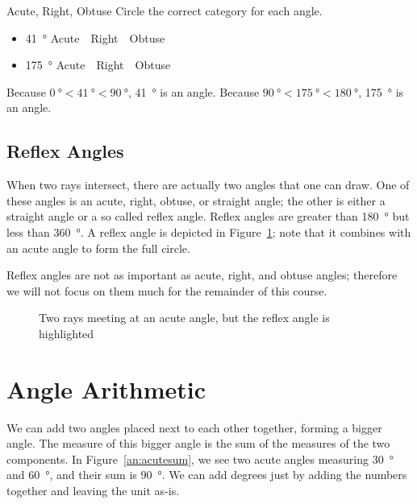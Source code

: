 \documentclass[a4paper,10pt]{report}
\begin{document}
\begin{problem}{Acute, Right, Obtuse}
 Circle the correct category for each angle.

 \begin{itemize}
  \item \SI{41}{\degree} \hfill Acute~~Right~~Obtuse
  \item \SI{175}{\degree} \hfill Acute~~Right~~Obtuse
 \end{itemize}

 \begin{solution}
  Because $\SI{0}{\degree} < \SI{41}{\degree} < \SI{90}{\degree}$,
  \SI{41}{\degree} is an  angle. Because $\SI{90}{\degree} <
  \SI{175}{\degree} < \SI{180}{\degree}$, \SI{175}{\degree} is an 
  angle.
 \end{solution}
\end{problem}

\subsection{Reflex Angles}

When two rays intersect, there are actually two angles that one can draw. One of
these angles is an acute, right, obtuse, or straight angle; the other is either
a straight angle or a so called \gls{reflex angle}. Reflex angles are greater
than \SI{180}{\degree} but less than \SI{360}{\degree}. A reflex angle is
depicted in Figure~\ref{an:tworaysreflex}; note that it combines with an acute
angle to form the full circle.

Reflex angles are not as important as acute, right, and obtuse angles; therefore
we will not focus on them much for the remainder of this course.

\begin{figure}

 \caption{Two rays meeting at an acute angle, but the reflex angle is
 highlighted}
 \label{an:tworaysreflex}
\end{figure}

\section{Angle Arithmetic}

We can add two angles placed next to each other together, forming a bigger
angle. The measure of this bigger angle is the sum of the measures of the two
components. In Figure~\ref{an:acutesum}, we see two acute angles measuring
\SI{30}{\degree} and \SI{60}{\degree}, and their sum is \SI{90}{\degree}. We can
add degrees just by adding the numbers together and leaving the unit as-is.
\end{document}
